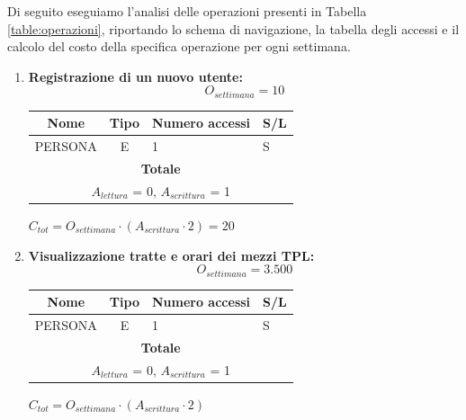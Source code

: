 \documentclass[12pt,a4paper]{report}
\begin{document}
\noindent Di seguito eseguiamo l'analisi delle operazioni presenti in Tabella \ref{table:operazioni}, riportando lo schema di navigazione, la tabella degli accessi e il calcolo del costo della specifica operazione per ogni settimana.
\begin{enumerate}[label=\textbf{\arabic*)}]

    \item \textbf{Registrazione di un nuovo utente:} \\
    \[ {O_{settimana} = 10} \]
    \begin{table}[H]
    \centering
    \begin{tabular}{|c|c|l|l|}
    \hline
    \textbf{Nome} & \textbf{Tipo} & \textbf{Numero accessi} & \textbf{S/L} \\
    \hline
    PERSONA & E & 1 & S \\
    \hline
    \multicolumn{4}{c}{\textbf{Totale}} \\    
    \multicolumn{4}{c}{${A_{lettura}}$ = 0, ${A_{scrittura}}$ = 1} \\
    \hline
    \end{tabular}
    \end{table}
    \begin{center}
    ${C_{tot} = {O_{settimana}}\cdot({A_{scrittura}}\cdot 2)= 20}$
    \end{center}

    \item \textbf{Visualizzazione tratte e orari dei mezzi TPL:} \\
    \[ {O_{settimana} = 3.500} \]
    \begin{table}[H]
    \centering
    \begin{tabular}{|c|c|l|l|}
    \hline
    \textbf{Nome} & \textbf{Tipo} & \textbf{Numero accessi} & \textbf{S/L} \\
    \hline
    PERSONA & E & 1 & S \\
    \hline
    \multicolumn{4}{c}{\textbf{Totale}} \\    
    \multicolumn{4}{c}{${A_{lettura}}$ = 0, ${A_{scrittura}}$ = 1} \\
    \hline
    \end{tabular}
    \end{table}
    \begin{center}
    ${C_{tot} = {O_{settimana}}\cdot({A_{scrittura}}\cdot 2)}$
    \end{center}


\end{enumerate}
\end{document}
